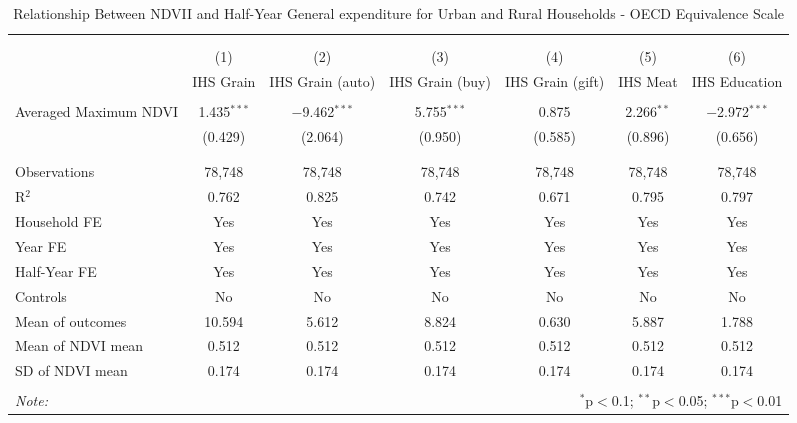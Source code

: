 
\begin{table}[!htbp] \centering 
  \caption{Relationship Between NDVII and Half-Year General expenditure for Urban and Rural Households - OECD Equivalence Scale} 
  \label{ndvi_table_2.tex} 
\normalsize 
\begin{tabular}{@{\extracolsep{5pt}}lcccccc} 
\\[-1.8ex]\hline 
\hline \\[-1.8ex] 
\\[-1.8ex] & (1) & (2) & (3) & (4) & (5) & (6)\\ 
 & IHS Grain & IHS Grain (auto) & IHS Grain (buy) & IHS Grain (gift) & IHS Meat & IHS Education \\ 
\hline \\[-1.8ex] 
 Averaged Maximum NDVI & 1.435$^{***}$ & $-$9.462$^{***}$ & 5.755$^{***}$ & 0.875 & 2.266$^{**}$ & $-$2.972$^{***}$ \\ 
  & (0.429) & (2.064) & (0.950) & (0.585) & (0.896) & (0.656) \\ 
  & & & & & & \\ 
\hline \\[-1.8ex] 
Observations & 78,748 & 78,748 & 78,748 & 78,748 & 78,748 & 78,748 \\ 
R$^{2}$ & 0.762 & 0.825 & 0.742 & 0.671 & 0.795 & 0.797 \\ 
Household FE & Yes & Yes & Yes & Yes & Yes & Yes \\ 
Year FE & Yes & Yes & Yes & Yes & Yes & Yes \\ 
Half-Year FE & Yes & Yes & Yes & Yes & Yes & Yes \\ 
Controls & No & No & No & No & No & No \\ 
Mean of outcomes & 10.594 & 5.612 & 8.824 & 0.630 & 5.887 & 1.788 \\ 
Mean of NDVI mean & 0.512 & 0.512 & 0.512 & 0.512 & 0.512 & 0.512 \\ 
SD of NDVI mean & 0.174 & 0.174 & 0.174 & 0.174 & 0.174 & 0.174 \\ 
\hline \\[-1.8ex] 
\textit{Note:}  & \multicolumn{6}{r}{$^{*}$p$<$0.1; $^{**}$p$<$0.05; $^{***}$p$<$0.01} \\ 
\end{tabular} 
\end{table} 
